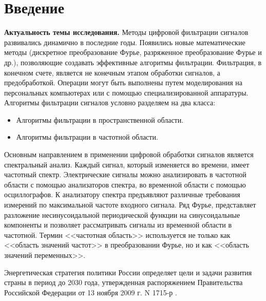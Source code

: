 \chapter*{Введение}                         %

\newcommand{\actuality}{}
\textbf{Актуальность темы исследования.}
Методы цифровой фильтрации сигналов развивались динамично в последние годы. Появились новые математические методы (дискретное преобразование Фурье, разряженное преобразование Фурье и др.), позволяющие создавать эффективные алгоритмы фильтрации. Фильтрация, в конечном счете, является не конечным этапом обработки сигналов, а предобработкой. Операции могут быть выполнены путем моделирования на персональных компьютерах или с помощью специализированной аппаратуры.
Алгоритмы фильтрации сигналов условно разделяем на два класса:
\begin{itemize}
	\item Алгоритмы фильтрации в пространственной области.
	\item Алгоритмы фильтрации в частотной области.
\end{itemize}

Основным направлением в применении цифровой обработки сигналов является спектральный анализ. Каждый сигнал, который изменяется во времени, имеет частотный спектр. Электрические сигналы можно анализировать в частотной области с помощью анализаторов спектра, во временной области с помощью осциллографов. К анализатору спектра предъявляют различные требования измерений по максимальной  частоте входного сигнала. Ряд Фурье, представляет разложение несинусоидальной периодической функции на синусоидальные компоненты и позволяет рассматривать сигналы из временной области в частотной. Термин <<частотная область>> используется не только как <<область значений частот>> в преобразовании Фурье, но и как <<область значений переменных>>.

Энергетическая стратегия политики России определяет цели и задачи развития страны в период до 2030 года, утвержденная распоряжением Правительства Российской Федерации от 13 ноября 2009 г. N 1715-р \cite{энергитическая_стратегия}. 


